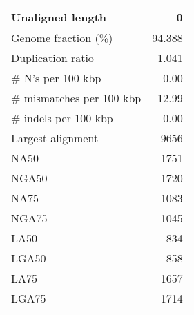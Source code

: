 \documentclass[12pt,a4paper]{article}
\begin{document}
\begin{table}[ht]
\begin{center}
\begin{tabular}{|l*{1}{|r}|}
Unaligned length & 0 \\ \hline
Genome fraction (\%) & 94.388 \\ \hline
Duplication ratio & 1.041 \\ \hline
\# N's per 100 kbp & 0.00 \\ \hline
\# mismatches per 100 kbp & 12.99 \\ \hline
\# indels per 100 kbp & 0.00 \\ \hline
Largest alignment & 9656 \\ \hline
NA50 & 1751 \\ \hline
NGA50 & 1720 \\ \hline
NA75 & 1083 \\ \hline
NGA75 & 1045 \\ \hline
LA50 & 834 \\ \hline
LGA50 & 858 \\ \hline
LA75 & 1657 \\ \hline
LGA75 & 1714 \\ \hline
\end{tabular}
\end{center}
\end{table}
\end{document}
